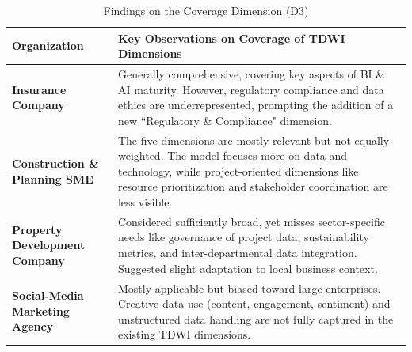\documentclass[conference]{IEEEtran}
\begin{document}
\begin{table}[t]
\centering
\caption{Findings on the Coverage Dimension (D3)}
\label{tab:d3_coverage}
\renewcommand{\arraystretch}{1.2}
\begin{tabular}{p{.16\linewidth} p{.74\linewidth}}
\hline
\textbf{Organization} & \textbf{Key Observations on Coverage of TDWI Dimensions} \\ \hline

\textbf{Insurance Company} & Generally comprehensive, covering key aspects of BI \& AI maturity. However, regulatory compliance and data ethics are underrepresented, prompting the addition of a new ``Regulatory \& Compliance" dimension. \\ \hline

\textbf{Construction \& Planning SME} & The five dimensions are mostly relevant but not equally weighted. The model focuses more on data and technology, while project-oriented dimensions like resource prioritization and stakeholder coordination are less visible. \\ \hline

\textbf{Property Development Company} & Considered sufficiently broad, yet misses sector-specific needs like governance of project data, sustainability metrics, and inter-departmental data integration. Suggested slight adaptation to local business context. \\ \hline

\textbf{Social-Media Marketing Agency} & Mostly applicable but biased toward large enterprises. Creative data use (content, engagement, sentiment) and unstructured data handling are not fully captured in the existing TDWI dimensions. \\ \hline
\end{tabular}
\end{table}
\end{document}
